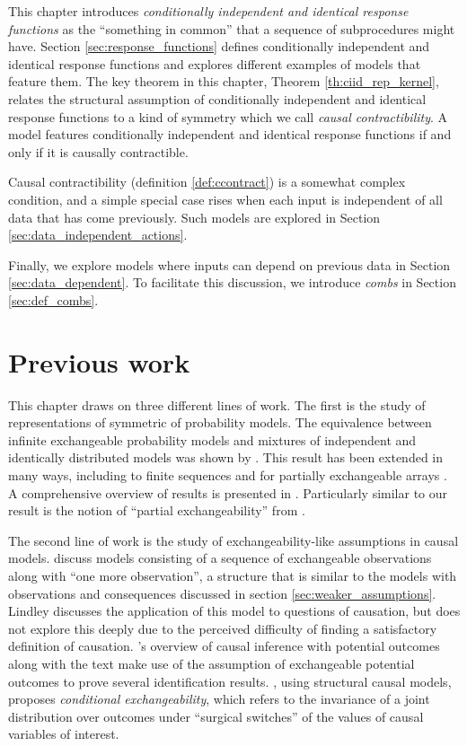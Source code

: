 This chapter introduces \emph{conditionally independent and identical response functions} as the ``something in common'' that a sequence of subprocedures might have. Section \ref{sec:response_functions} defines conditionally independent and identical response functions and explores different examples of models that feature them. The key theorem in this chapter, Theorem \ref{th:ciid_rep_kernel}, relates the structural assumption of conditionally independent and identical response functions to a kind of symmetry which we call \emph{causal contractibility}. A model features conditionally independent and identical response functions if and only if it is causally contractible.

Causal contractibility (definition \ref{def:ccontract}) is a somewhat complex condition, and a simple special case rises when each input is independent of all data that has come previously. Such models are explored in Section \ref{sec:data_independent_actions}. 

Finally, we explore models where inputs can depend on previous data in Section \ref{sec:data_dependent}. To facilitate this discussion, we introduce \emph{combs} in Section \ref{sec:def_combs}.

\section{Previous work}\label{sec:prev_work}

This chapter draws on three different lines of work. The first is the study of representations of symmetric of probability models. The equivalence between infinite exchangeable probability models and mixtures of independent and identically distributed models was shown by \cite{de_finetti_foresight_1992}. This result has been extended in many ways, including to finite sequences \citet{kerns_definettis_2006,diaconis_finite_1980} and for partially exchangeable arrays \citet{aldous_representations_1981}. A comprehensive overview of results is presented in \citet{kallenberg_probabilistic_2005}. Particularly similar to our result is the notion of ``partial exchangeability'' from \citet{diaconis_recent_1988}.

The second line of work is the study of exchangeability-like assumptions in causal models. \citet{lindley_role_1981} discuss models consisting of a sequence of exchangeable observations along with ``one more observation'', a structure that is similar to the models with observations and consequences discussed in section \ref{sec:weaker_assumptions}. Lindley discusses the application of this model to questions of causation, but does not explore this deeply due to the perceived difficulty of finding a satisfactory definition of causation. \citet{rubin_causal_2005}'s overview of causal inference with potential outcomes along with the text \citet{imbens_causal_2015} make use of the assumption of exchangeable potential outcomes to prove several identification results. \citet{saarela_role_2020}, using structural causal models, proposes \emph{conditional exchangeability}, which refers to the invariance of a joint distribution over outcomes under ``surgical switches'' of the values of causal variables of interest.

